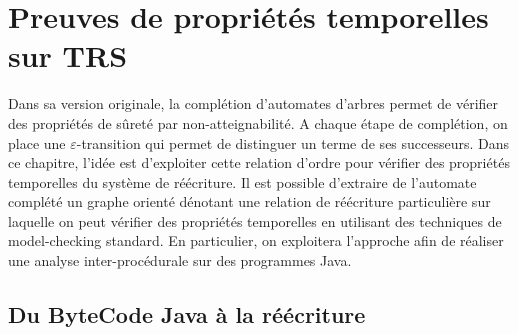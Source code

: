\chapter{Preuves de propriétés temporelles sur TRS}

Dans sa version originale, la complétion d'automates d'arbres permet
de vérifier des propriétés de sûreté par non-atteignabilité.
A chaque étape de complétion, on place une $\varepsilon$-transition
qui permet de distinguer un terme de ses successeurs. Dans ce chapitre, l'idée
est d'exploiter cette relation d'ordre pour vérifier des propriétés 
temporelles du système de réécriture. Il est possible d'extraire de l'automate
complété un graphe orienté dénotant une relation de réécriture particulière
sur laquelle on peut vérifier des propriétés temporelles en utilisant des
techniques de model-checking standard. En particulier, on exploitera
l'approche afin de réaliser une analyse inter-procédurale
sur des programmes Java.




\section{Du ByteCode Java à la réécriture}

